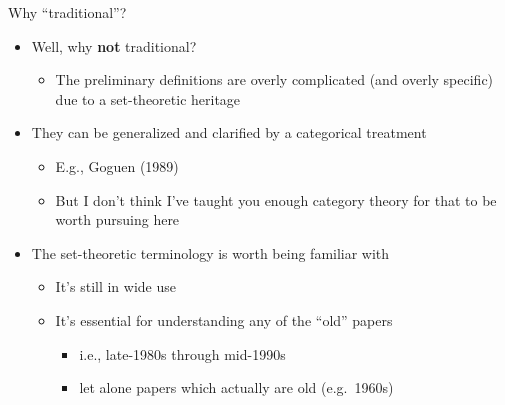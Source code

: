 \documentclass[pdf,fyma2]{prosper} %
\newcommand{\hilighten}[1]{{\color{fymablue}#1}}
\renewcommand{\emph}[1]{\hilighten{\textbf{#1}}}
\begin{document}
\begin{slide}{Why ``traditional''?}
	\vspace{1em}
	\begin{itemize}
	\item Well, why \emph{not} traditional?
        \begin{itemize}
	    \item The preliminary definitions are overly complicated (and overly specific) due to a set-theoretic heritage
        \end{itemize}
	\vspace{1em}
	\item They can be generalized and clarified by a categorical treatment
        \begin{itemize}
        \item E.g., Goguen (1989)
        \item But I don't think I've taught you enough category theory for that to be worth pursuing here
        \end{itemize}
	\vspace{1em}
    \item The set-theoretic terminology is worth being familiar with
        \begin{itemize}
        \item It's still in wide use
        \item It's essential for understanding any of the ``old'' papers
            \begin{itemize}
            \item i.e., late-1980s through mid-1990s
            \item let alone papers which actually are old (e.g.\ 1960s)
            \end{itemize}
        \end{itemize}
	\end{itemize}
\end{slide}
\end{document}
